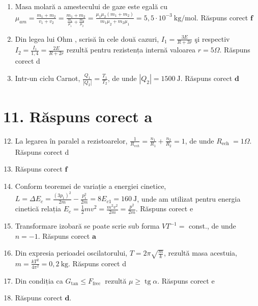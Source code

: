 \begin{enumerate}
  \item Masa molară a amestecului de gaze este egală cu $\mu_{a m}=\frac{m_{1}+m_{2}}{v_{1}+v_{2}}=\frac{m_{1}+m_{2}}{\frac{m_{1}}{\mu_{1}}+\frac{m_{2}}{\mu_{2}}}=\frac{\mu_{1} \mu_{2}\left(m_{1}+m_{2}\right)}{m_{1} \mu_{2}+m_{2} \mu_{1}}=5,5 \cdot 10^{-3} \mathrm{~kg} / \mathrm{mol}$. Răspuns corect $\boldsymbol{f}$
  \item Din legea lui Ohm , scrisă în cele două cazuri, $I_{1}=\frac{3 E}{R+3 r}$ şi respectiv $I_{2}=\frac{I_{1}}{1,4}=\frac{2 E}{R+2 r}$ rezultă pentru rezistența internă valoarea $r=5 \Omega$. Răspuns corect d
  \item Intr-un ciclu Carnot, $\frac{Q_{1}}{\left|Q_{2}\right|}=\frac{T_{1}}{T_{2}}$, de unde $\left|Q_{2}\right|=1500 \mathrm{~J}$. Răspuns corect $\boldsymbol{d}$
\end{enumerate}

\section*{11. Răspuns corect a}
\begin{enumerate}
  \setcounter{enumi}{11}
  \item La legarea în paralel a rezistoarelor, $\frac{1}{R_{e c h}}=\frac{n_{1}}{R_{1}}+\frac{n_{2}}{R_{2}}=1$, de unde $R_{\text {ech }}=1 \Omega$. Răspuns corect d
  \item Răspuns corect $\boldsymbol{f}$
  \item Conform teoremei de variație a energiei cinetice, $L=\Delta E_{c}=\frac{\left(3 p_{1}\right)^{2}}{2 m}-\frac{p_{1}^{2}}{2 m}=8 E_{c 1}=160 \mathrm{~J}$, unde am utilizat pentru energia cinetică relația $E_{c}=\frac{1}{2} m v^{2}=\frac{m^{2} v^{2}}{2 m}=\frac{p^{2}}{2 m}$. Răspuns corect e
  \item Transformare izobară se poate scrie sub forma $V T^{-1}=$ const., de unde $n=-1$. Răspuns corect $\boldsymbol{a}$
  \item Din expresia perioadei oscilatorului, $T=2 \pi \sqrt{\frac{m}{k}}$, rezultă masa acestuia, $m=\frac{k T^{2}}{4 \pi^{2}}=0,2 \mathrm{~kg}$. Răspuns corect d
  \item Din condiția ca $G_{\tan } \leq F_{\text {frec }}$ rezultă $\mu \geq \operatorname{tg} \alpha$. Răspuns corect e
  \item Răspuns corect $\boldsymbol{d}$.
\end{enumerate}

